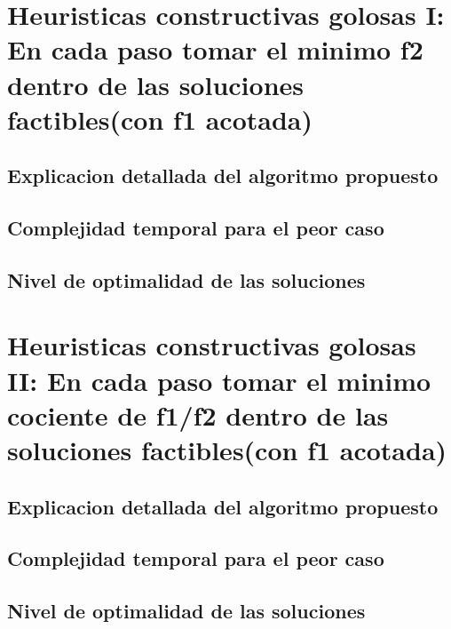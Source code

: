 \section{Heuristicas constructivas golosas I: En cada paso tomar el minimo f2 dentro de las soluciones factibles(con f1 acotada)}
\subsection{Explicacion detallada del algoritmo propuesto}
\subsection{Complejidad temporal para el peor caso}
\subsection{Nivel de optimalidad de las soluciones}%


\section{Heuristicas constructivas golosas II: En cada paso tomar el minimo cociente de f1/f2 dentro de las soluciones factibles(con f1 acotada)}
\subsection{Explicacion detallada del algoritmo propuesto}
\subsection{Complejidad temporal para el peor caso}
\subsection{Nivel de optimalidad de las soluciones}%
